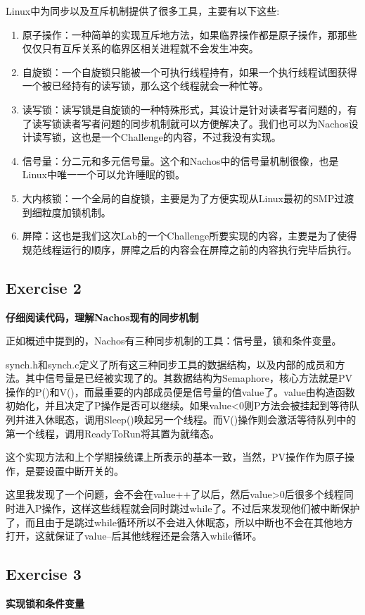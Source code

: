 \documentclass[nofonts]{ctexart}
\begin{document}
Linux中为同步以及互斥机制提供了很多工具，主要有以下这些:
\begin{enumerate}
\item 原子操作：一种简单的实现互斥地方法，如果临界操作都是原子操作，那那些仅仅只有互斥关系的临界区相关进程就不会发生冲突。
\item 自旋锁：一个自旋锁只能被一个可执行线程持有，如果一个执行线程试图获得一个被已经持有的读写锁，那么这个线程就会一种忙等。 
\item 读写锁：读写锁是自旋锁的一种特殊形式，其设计是针对读者写者问题的，有了读写锁读者写者问题的同步机制就可以方便解决了。我们也可以为Nachos设计读写锁，这也是一个Challenge的内容，不过我没有实现。
\item 信号量：分二元和多元信号量。这个和Nachos中的信号量机制很像，也是Linux中唯一一个可以允许睡眠的锁。
\item 大内核锁：一个全局的自旋锁，主要是为了方便实现从Linux最初的SMP过渡到细粒度加锁机制。
\item 屏障：这也是我们这次Lab的一个Challenge所要实现的内容，主要是为了使得规范线程运行的顺序，屏障之后的内容会在屏障之前的内容执行完毕后执行。
\end{enumerate}

\subsection*{Exercise 2}
\textbf{仔细阅读代码，理解Nachos现有的同步机制}

正如概述中提到的，Nachos有三种同步机制的工具：信号量，锁和条件变量。

synch.h和synch.c定义了所有这三种同步工具的数据结构，以及内部的成员和方法。其中信号量是已经被实现了的。其数据结构为Semaphore，核心方法就是PV操作的P()和V()，而最重要的内部成员便是信号量的值value了。value由构造函数初始化，并且决定了P操作是否可以继续。如果value<0则P方法会被挂起到等待队列并进入休眠态，调用Sleep()唤起另一个线程。而V()操作则会激活等待队列中的第一个线程，调用ReadyToRun将其置为就绪态。

这个实现方法和上个学期操统课上所表示的基本一致，当然，PV操作作为原子操作，是要设置中断开关的。

这里我发现了一个问题，会不会在value++了以后，然后value>0后很多个线程同时进入P操作，这样这些线程就会同时跳过while了。不过后来发现他们被中断保护了，而且由于是跳过while循环所以不会进入休眠态，所以中断也不会在其他地方打开，这就保证了value--后其他线程还是会落入while循环。

\subsection*{Exercise 3}
\textbf{实现锁和条件变量}
\end{document}
